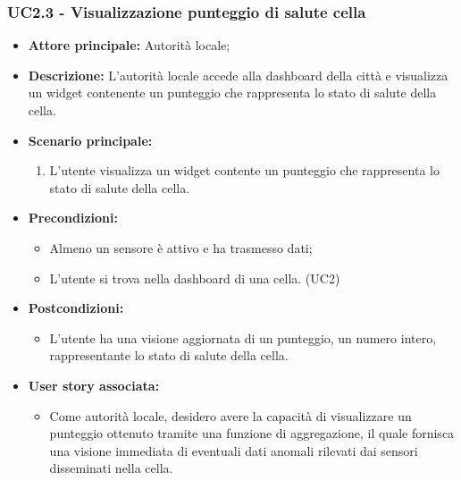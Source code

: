 \subsubsection{UC2.3 - Visualizzazione punteggio di salute cella}
\begin{itemize}
    \item \textbf{Attore principale:} Autorità locale;
    \item \textbf{Descrizione:} L'autorità locale accede alla dashboard della città e visualizza un widget contenente un punteggio che rappresenta lo stato di salute della cella.
    \item \textbf{Scenario principale:}
          \begin{enumerate}
              \item L'utente visualizza un widget contente un punteggio che rappresenta lo stato di salute della cella.
          \end{enumerate}
    \item \textbf{Precondizioni:}
          \begin{itemize}
              \item Almeno un sensore è attivo e ha trasmesso dati;
              \item L'utente si trova nella dashboard di una cella. (UC2)
          \end{itemize}
    \item \textbf{Postcondizioni:}
          \begin{itemize}
              \item      L'utente ha una visione aggiornata di un punteggio, un numero intero, rappresentante lo stato di salute della cella.
          \end{itemize}
    \item \textbf{User story associata:}
          \begin{itemize}
              \item Come autorità locale, desidero avere la capacità di visualizzare un punteggio ottenuto tramite una funzione di aggregazione, il quale fornisca una visione immediata di eventuali dati anomali rilevati dai sensori disseminati nella cella.
          \end{itemize}
\end{itemize}